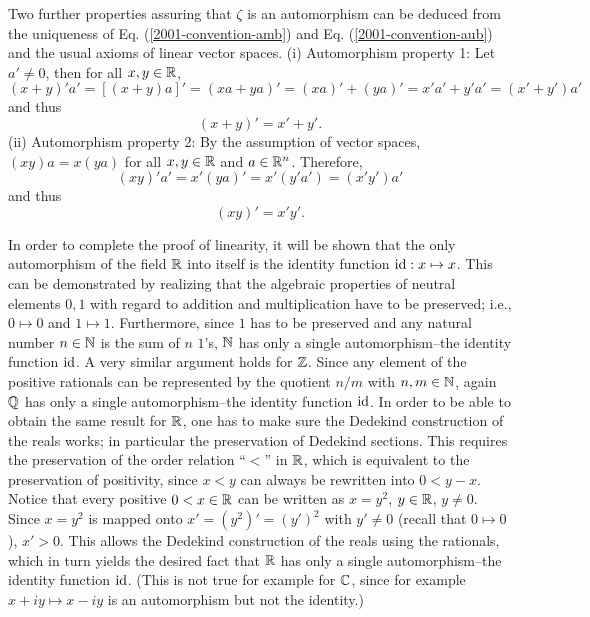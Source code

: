 Two further properties assuring that $\zeta$ is an automorphism
 can be deduced from the uniqueness of
Eq. (\ref{2001-convention-amb})
and Eq. (\ref{2001-convention-aub}) and the usual axioms of linear
vector spaces.
(i) Automorphism property 1:
Let $a'\neq 0$, then for all $x,y\in {\Bbb R}$,
\begin{equation}
(x+y)'a'=[(x+y)a]'=(xa+ya)'=(xa)'+(ya)'=x'a'+y'a'=(x'+y')a'
\end{equation}
and thus
\begin{equation}
(x+y)'=x'+y'.
\end{equation}
(ii) Automorphism property 2:
By the assumption of vector spaces,
$(xy)a=x(ya)$  for all $x,y\in {\Bbb R}$ and $a\in {\Bbb R}^n$.
Therefore,
\begin{equation}
(xy)'a'=x'(ya)'=x'(y'a')=(x'y')a'
\end{equation}
and thus
\begin{equation}
(xy)'=x'y'.
\end{equation}





In order to complete the proof of linearity, it will be shown that the only
automorphism of the field ${\Bbb R}$ into itself is the identity function ${\rm id}:x\mapsto
x$.
This can be demonstrated by realizing that
the algebraic properties of neutral
elements $0,1$ with regard to addition and multiplication have to be
preserved; i.e.,
$0\mapsto 0$
and
$1\mapsto 1$.
Furthermore, since $1$ has to be preserved and any natural number $n\in {\Bbb N}$
is the sum of $n$ $1$'s, ${\Bbb N}$ has only a single automorphism--the identity
function
${\rm id}$.
A very similar argument  holds for ${\Bbb Z}$.
Since any element of the positive rationals
can be represented by the quotient $n/m$ with $n,m\in {\Bbb N}$,
again ${\Bbb Q}$ has only a single automorphism--the identity
function ${\rm id}$.
In order to be able to obtain the same result for  ${\Bbb R}$,
one has to make sure the Dedekind construction of
the reals works; in particular the
preservation of Dedekind sections.
This requires the preservation of the order relation ``$<$'' in ${\Bbb R}$,
which is equivalent to the preservation of positivity, since
$x< y$ can always be rewritten into $0< y-x$.
Notice that every
positive $0< x\in {\Bbb R}$ can be written as $x=y^2$, $y\in {\Bbb R}$,
$y\neq 0$.
Since $x=y^2$ is mapped onto $x'=(y^2)'=(y')^2$ with $y'\neq 0$ (recall
that $0\mapsto 0$), $x'>0$.
This allows the Dedekind construction of the reals using the
rationals, which in turn yields the desired fact that
${\Bbb R}$ has only a single automorphism--the identity
function ${\rm id}$.
(This is not true for example for ${\Bbb C}$,
since for example $x+iy\mapsto x-iy$ is an automorphism but not the
identity.)


